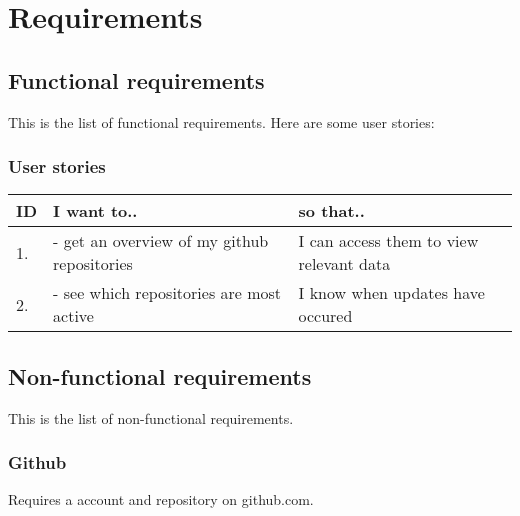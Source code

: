 \chapter{Requirements}
\section{Functional requirements}
This is the list of functional requirements.
Here are some user stories:

\subsection{User stories}
\vspace{0.5cm}
 \begin{tabular}{| l | p{7cm} | l |}
    \hline
    \rowcolor[gray]{0.8}
    \textbf{ID} & \textbf{I want to..} & \textbf{so that..} \\
    \hline
    1. & - get an overview of my github repositories & I can access them to view relevant data\\
    2. & - see which repositories are most active  & I know when updates have occured\\
    \hline
\end{tabular}
\vspace{0.5cm}

\section{Non-functional requirements}
This is the list of non-functional requirements.
\subsection{Github}
Requires a account and repository on github.com.
\subsection{}